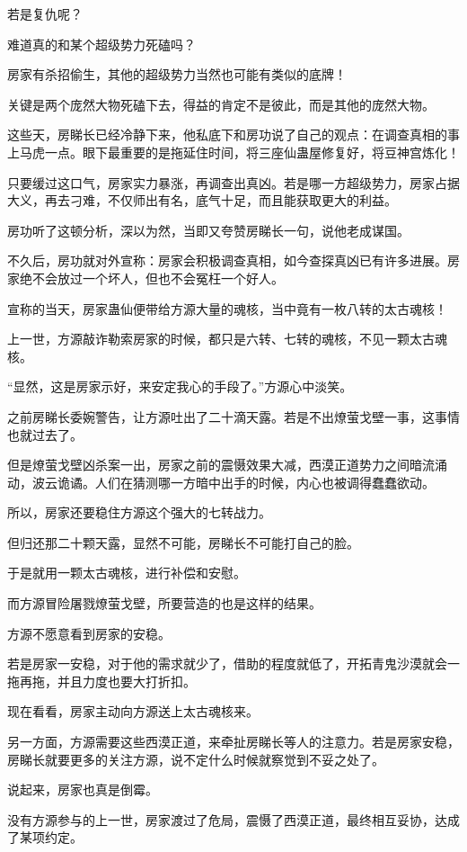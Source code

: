 \begin{this_body}
若是复仇呢？

难道真的和某个超级势力死磕吗？

房家有杀招偷生，其他的超级势力当然也可能有类似的底牌！

关键是两个庞然大物死磕下去，得益的肯定不是彼此，而是其他的庞然大物。

这些天，房睇长已经冷静下来，他私底下和房功说了自己的观点：在调查真相的事上马虎一点。眼下最重要的是拖延住时间，将三座仙蛊屋修复好，将豆神宫炼化！

只要缓过这口气，房家实力暴涨，再调查出真凶。若是哪一方超级势力，房家占据大义，再去刁难，不仅师出有名，底气十足，而且能获取更大的利益。

房功听了这顿分析，深以为然，当即又夸赞房睇长一句，说他老成谋国。

不久后，房功就对外宣称：房家会积极调查真相，如今查探真凶已有许多进展。房家绝不会放过一个坏人，但也不会冤枉一个好人。

宣称的当天，房家蛊仙便带给方源大量的魂核，当中竟有一枚八转的太古魂核！

上一世，方源敲诈勒索房家的时候，都只是六转、七转的魂核，不见一颗太古魂核。

“显然，这是房家示好，来安定我心的手段了。”方源心中淡笑。

之前房睇长委婉警告，让方源吐出了二十滴天露。若是不出燎萤戈壁一事，这事情也就过去了。

但是燎萤戈壁凶杀案一出，房家之前的震慑效果大减，西漠正道势力之间暗流涌动，波云诡谲。人们在猜测哪一方暗中出手的时候，内心也被调得蠢蠢欲动。

所以，房家还要稳住方源这个强大的七转战力。

但归还那二十颗天露，显然不可能，房睇长不可能打自己的脸。

于是就用一颗太古魂核，进行补偿和安慰。

而方源冒险屠戮燎萤戈壁，所要营造的也是这样的结果。

方源不愿意看到房家的安稳。

若是房家一安稳，对于他的需求就少了，借助的程度就低了，开拓青鬼沙漠就会一拖再拖，并且力度也要大打折扣。

现在看看，房家主动向方源送上太古魂核来。

另一方面，方源需要这些西漠正道，来牵扯房睇长等人的注意力。若是房家安稳，房睇长就要更多的关注方源，说不定什么时候就察觉到不妥之处了。

说起来，房家也真是倒霉。

没有方源参与的上一世，房家渡过了危局，震慑了西漠正道，最终相互妥协，达成了某项约定。


\end{this_body}

